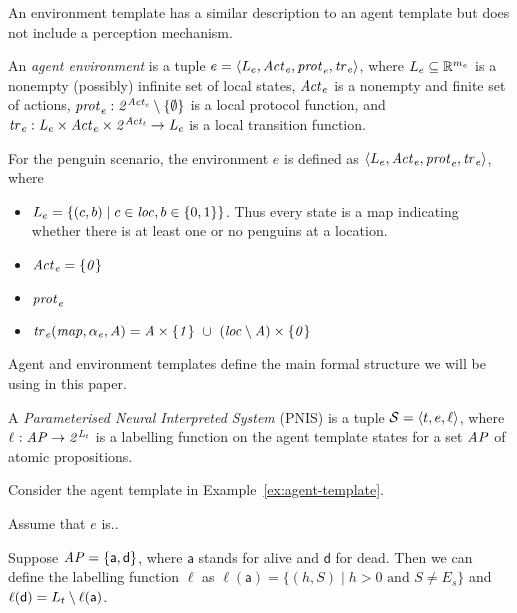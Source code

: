 An environment template has a similar description to an agent template but does
not include a perception mechanism.

\begin{definition}
An {\em agent environment} is a tuple ${e} = \left \langle L_{e}, \it{Act}_{e}, \it{prot}_{e}, \it{tr}_{e}  \right \rangle$, where $L_{e}  \subseteq \mathbb R^{m_e}$ is a nonempty
(possibly) infinite set of local states, $\it{Act}_{e}$ is a nonempty and finite set
of actions,  $\it{prot}_{e} : 2^{\it{Act}_{e}} \setminus \left \{ \emptyset \right \}$ is a local
protocol function, and $\it{tr}_{e} : L_{e} \times \it{Act}_{e} \times 2^{\it{Act}_{t}} 
\rightarrow L_{e}$ is a local transition function.
\end{definition}

\begin{example}
  For the penguin scenario, the environment $e$ is defined as
  $\left \langle L_{e}, \it{Act}_{e}, \it{prot}_{e}, \it{tr}_{e} \right \rangle$, where
  \begin{itemize}[$\bullet$]
  \item $L_{e} = \{(c,b) \mid c \in \mathit{loc}, b\in\{0,1\}\}$. Thus
    every state is a map indicating whether there is at least one or no
    penguins at a location.
  \item $\it{Act}_{e} = \{0\}$
  \item $\it{prot}_{e}$
  \item
    $\it{tr}_{e}(\mathit{map}, \it{\alpha}_{e}, A) = A \times \{1\} \ \cup \
    (\mathit{loc}\setminus A) \times \{0\}$
  \end{itemize}
\end{example}

Agent and environment templates define the main formal structure we will be
using in this paper.

\begin{definition}
  A {\em Parameterised Neural Interpreted System} (PNIS) is a tuple $\mathcal S
  = \left \langle {t}, {e}, \ell \right \rangle$, where $\ell_{} : \it{AP} \rightarrow
  2^{L_{t}}$ is a labelling function on the agent  template states for a set
  $\it{AP}$ of atomic propositions.
\end{definition}

\begin{example}
  \label{ex:pnis}
  Consider the agent template in Example~\ref{ex:agent-template}.

  Assume that $e$ is.. %
  
  Suppose $\it{AP} = \{\mathsf{a}, \mathsf{d}\}$, where $\mathsf{a}$ stands for
  alive and $\mathsf{d}$ for dead. Then we can define the labelling function
  $\ell$ as $\ell(\mathsf{a}) = \{(h,S) \mid h > 0 \text{ and }S \neq E_s\}$
  and $\ell(\mathsf{d}) = L_{t} \setminus \ell(\mathsf{a})$.
\end{example}

